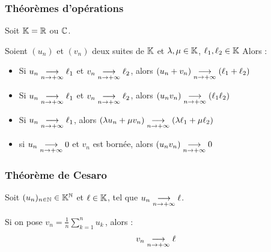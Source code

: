 \subsubsection{Théorèmes d'opérations}

\begin{theoreme}{}{}
    Soit $\mathbb{K} = \mathbb{R}$ ou $\mathbb{C}$. 

    Soient $(u_n)$ et $(v_n)$ deux suites de $\mathbb{K}$ et $\lambda, \mu \in \mathbb{K}$, $\ell_1, \ell_2 \in \mathbb{K}$ Alors : 

    \begin{itemize}
        \item Si $u_n \underset{n \to +\infty}{\longrightarrow} \ell_1$ et $v_n \underset{n \to +\infty}{\longrightarrow} \ell_2$, alors $(u_n + v_n) \underset{n \to +\infty}{\longrightarrow} (\ell_1 + \ell_2)$
        \item Si $u_n \underset{n \to +\infty}{\longrightarrow} \ell_1$ et $v_n \underset{n \to +\infty}{\longrightarrow} \ell_2$, alors $(u_n v_n) \underset{n \to +\infty}{\longrightarrow} (\ell_1 \ell_2)$
        \item Si $u_n \underset{n \to +\infty}{\longrightarrow} \ell_1$, alors $(\lambda u_n + \mu v_n) \underset{n \to +\infty}{\longrightarrow} (\lambda \ell_1 + \mu \ell_2)$
        \item si $u_n \underset{n \to +\infty}{\longrightarrow} 0$ et $v_n$ est bornée, alors $(u_n v_n) \underset{n \to +\infty}{\longrightarrow} 0$
    \end{itemize}
\end{theoreme}

\subsubsection{Théorème de Cesaro}

\begin{theoreme}{}{}
    Soit $(u_n)_{n \in \mathbb{N}} \in \mathbb{K}^{\mathbb{N}}$ et $\ell \in \mathbb{K}$, tel que $u_n \underset{n \to +\infty}{\longrightarrow} \ell$.
    
    Si on pose $\displaystyle v_n = \frac 1 n \sum_{k=1}^n u_k$\,, alors :
    $$v_n \underset{n \to +\infty}{\longrightarrow} \ell$$
\end{theoreme}


